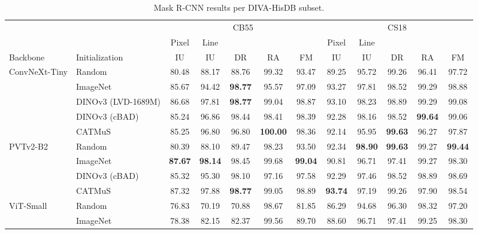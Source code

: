 \begin{table}[htbp]
    \centering
    \scriptsize
    \setlength{\tabcolsep}{1.3pt}
    \renewcommand{\arraystretch}{0.92}
    \caption{Mask R-CNN results per DIVA-HisDB subset.}
    \label{tab:rq1-maskrcnn-diva-subsets}\label{tab:rq1-maskrcnn-diva-average}
    \begin{tabular*}{\textwidth}{@{\extracolsep{\fill}}ll*{10}{c}@{}}
        \toprule
        & & \multicolumn{5}{c}{CB55} & \multicolumn{5}{c}{CS18} \\
        \cmidrule(lr){3-7}\cmidrule(l){8-12}
        & & Pixel & Line & & & & Pixel & Line & & & \\
        Backbone & Initialization & IU & IU & DR & RA & FM & IU & IU & DR & RA & FM \\
        \midrule
        ConvNeXt-Tiny & Random & 80.48 & 88.17 & 88.76 & 99.32 & 93.47 & 89.25 & 95.72 & 99.26 & 96.41 & 97.72 \\
         & ImageNet & 85.67 & 94.42 & \textbf{98.77} & 95.57 & 97.09 & 93.27 & 97.81 & 98.52 & 99.29 & 98.88 \\
         & DINOv3 (LVD-1689M) & 86.68 & 97.81 & \textbf{98.77} & 99.04 & 98.87 & 93.10 & 98.23 & 98.89 & 99.29 & 99.08 \\
         & DINOv3 (cBAD) & 85.24 & 96.86 & 98.44 & 98.41 & 98.39 & 92.28 & 98.16 & 98.52 & \textbf{99.64} & 99.06 \\
         & CATMuS & 85.25 & 96.80 & 96.80 & \textbf{100.00} & 98.36 & 92.14 & 95.95 & \textbf{99.63} & 96.27 & 97.87 \\
        \addlinespace[1pt]
        PVTv2-B2 & Random & 80.39 & 88.10 & 89.47 & 98.23 & 93.50 & 92.34 & \textbf{98.90} & \textbf{99.63} & 99.27 & \textbf{99.44} \\
         & ImageNet & \textbf{87.67} & \textbf{98.14} & 98.45 & 99.68 & \textbf{99.04} & 90.81 & 96.71 & 97.41 & 99.27 & 98.30 \\
         & DINOv3 (cBAD) & 85.32 & 95.30 & 98.10 & 97.16 & 97.58 & 92.29 & 97.46 & 98.52 & 98.89 & 98.69 \\
         & CATMuS & 87.32 & 97.88 & \textbf{98.77} & 99.05 & 98.89 & \textbf{93.74} & 97.19 & 99.26 & 97.90 & 98.54 \\
        \addlinespace[1pt]
        ViT-Small & Random & 76.83 & 70.19 & 70.88 & 98.67 & 81.85 & 86.29 & 94.68 & 96.30 & 98.32 & 97.20 \\
         & ImageNet & 78.38 & 82.15 & 82.37 & 99.56 & 89.70 & 88.60 & 96.71 & 97.41 & 99.25 & 98.30 \\

\end{tabular*}
\end{table}
